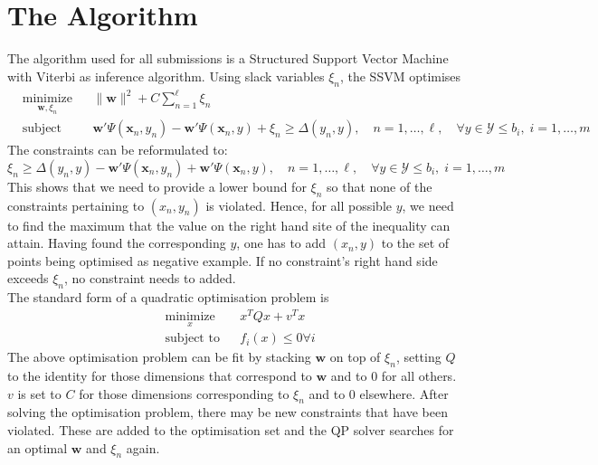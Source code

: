 \documentclass[]{article}
\begin{document}
\section{The Algorithm}
The algorithm used for all submissions is a Structured Support Vector Machine with Viterbi as inference algorithm. Using slack variables $\xi_n$, the SSVM optimises
\begin{equation}
	\begin{aligned}
		& \underset{\boldsymbol{w},\xi_n}{\text{minimize}}
		& & \|\boldsymbol{w}\|^2 + C \sum_{n=1}^{\ell} \xi_n \\
		& \text{subject to}
		& & \boldsymbol{w}' \Psi(\boldsymbol{x}_n,y_n) - \boldsymbol{w}' \Psi(\boldsymbol{x}_n,y) + \xi_n \geq \Delta(y_n,y),\quad n=1,\dots,\ell,\quad \forall y \in \mathcal{Y} \leq b_i, \; i = 1, \ldots, m
	\end{aligned}
\end{equation}
The constraints can be reformulated to:
\begin{equation}
	\xi_n\geq \Delta(y_n,y)-\boldsymbol{w}' \Psi(\boldsymbol{x}_n,y_n) + \boldsymbol{w}' \Psi(\boldsymbol{x}_n,y),\quad n=1,\dots,\ell,\quad \forall y \in \mathcal{Y} \leq b_i, \; i = 1, \ldots, m
\end{equation}
This shows that we need to provide a lower bound for $\xi_n$ so that none of the constraints pertaining to $(x_n,y_n)$ is violated. Hence, for all possible $y$, we need to find the maximum that the value on the right hand site of the inequality can attain. Having found the corresponding $y$, one has to add $(x_n,y)$ to the set of points being optimised as negative example. If no constraint's right hand side exceeds $\xi_n$, no constraint needs to added.\\
The standard form of a quadratic optimisation problem is 
\begin{equation}
\begin{aligned}
& \underset{x}{\text{minimize}}
& &  x^TQx+v^Tx\\
& \text{subject to}
& & f_i(x)\leq 0 \forall i
\end{aligned}
\end{equation}
The above optimisation problem can be fit by stacking $\boldsymbol{w}$ on top of $\xi_n$, setting $Q$ to the identity for those dimensions that correspond to $\boldsymbol{w}$ and to $0$ for all others. $v$ is set to $C$ for those dimensions corresponding to $\xi_n$ and to $0$ elsewhere. After solving the optimisation problem, there may be new constraints that have been violated. These are added to the optimisation set and the QP solver searches for an optimal $\boldsymbol{w}$ and $\xi_n$ again.
\end{document}
